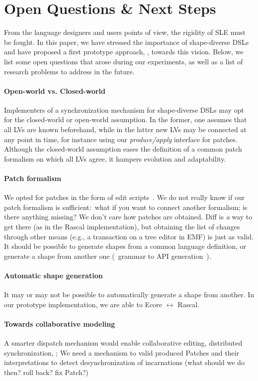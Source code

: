 \section{Open Questions \& Next Steps}
\label{sec:discussion}
From the language designers and users points of view, the rigidity of SLE must be fought.
In this paper, we have stressed the importance of shape-diverse DSLs and have proposed a first prototype approach, \prism, towards this vision.
Below, we list some open questions that arose during our experiments, as well as a list of research problems to address in the future.

\paragraph{Open-world vs. Closed-world}
Implementers of a synchronization mechanism for shape-diverse DSLs may opt for the closed-world or open-world assumption.
In the former, one assumes that all LVs are known beforehand, while in the latter new LVs may be connected at any point in time, for instance using our \emph{produce/apply} interface for patches.
Although the closed-world assumption eases the definition of a common patch formalism on which all LVs agree, it hampers evolution and adaptability.

\paragraph{Patch formalism}
We opted for patches in the form of edit scripts~\cite{rozen2017towards}.
We do not really know if our patch formalism is sufficient:~what if you want to connect another formalism; is there anything missing?
We don’t care how patches are obtained. Diff is \emph{a} way to get there (as in the Rascal implementation), but obtaining the list of changes through other means (e.g., a transaction on a tree editor in EMF) is just as valid.
It should be possible to generate shapes from a common language definition, or generate a shape from another one (\eg~grammar to API generation~\cite{IThinkGPCEHadAPaperOnThat}).

\paragraph{Automatic shape generation}
It may or may not be possible to automatically generate a shape from another.
In our prototype implementation, we are able to Ecore $\leftrightarrow$ Rascal.

\paragraph{Towards collaborative modeling}
A smarter dispatch mechanism would enable collaborative editing, distributed synchronization, \etc;
We need a mechanism to valid produced Patches and their interpretations to detect desynchronization of incarnations (what should we do then? roll back? fix Patch?)

